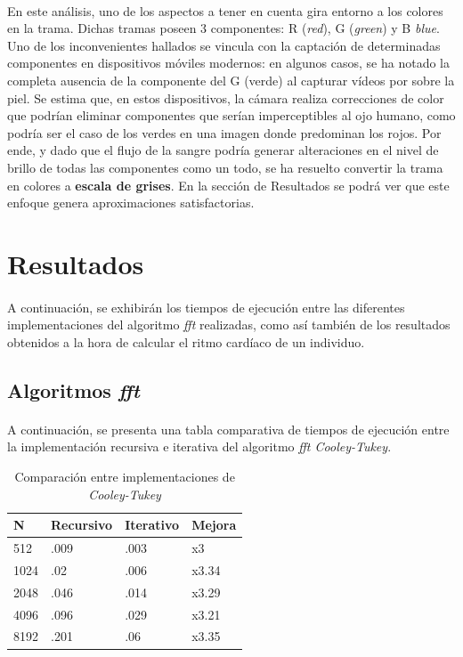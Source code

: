 \documentclass[12pt, twocolumn]{article}
\begin{document}
	\paragraph{} En este análisis, uno de los aspectos a tener en cuenta gira entorno a los colores en la trama. Dichas tramas poseen 3 componentes: R (\textit{red}), G (\textit{green}) y B \textit{blue}. Uno de los inconvenientes hallados se vincula con la captación de determinadas componentes en dispositivos móviles modernos: en algunos casos, se ha notado la completa ausencia de la componente del G (verde) al capturar vídeos por sobre la piel. Se estima que, en estos dispositivos, la cámara realiza correcciones de color que podrían eliminar componentes que serían imperceptibles al ojo humano, como podría ser el caso de los verdes en una imagen donde predominan los rojos. Por ende, y dado que el flujo de la sangre podría generar alteraciones en el nivel de brillo de todas las componentes como un todo, se ha resuelto convertir la trama en colores a \textbf{escala de grises}. En la sección de Resultados se podrá ver que este enfoque genera aproximaciones satisfactorias.
	

	\section{Resultados}
	
	\paragraph{} A continuación, se exhibirán los tiempos de ejecución entre las diferentes implementaciones del algoritmo \textit{fft} realizadas, como así también de los resultados obtenidos a la hora de calcular el ritmo cardíaco de un individuo.
	
	\subsection{Algoritmos \textit{fft}}
	
	\paragraph{} A continuación, se presenta una tabla comparativa de tiempos de ejecución entre la implementación recursiva e iterativa del algoritmo \textit{fft Cooley-Tukey}.
	
	\begin{table}[H]
		\centering
		\begin{tabular}{@{}llll@{}}
			\toprule
			N    & Recursivo & Iterativo & Mejora \\ \midrule
			512  & .009      & .003      & x3     \\
			1024 & .02       & .006      & x3.34  \\
			2048 & .046      & .014      & x3.29  \\
			4096 & .096      & .029      & x3.21  \\
			8192 & .201      & .06       & x3.35  \\ \bottomrule
		\end{tabular}
		\caption{Comparación entre implementaciones de \textit{Cooley-Tukey}}
		\label{fftcmp}
	\end{table}
	
\end{document}
